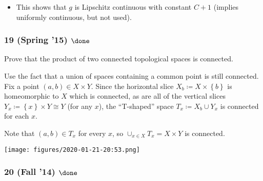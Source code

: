 \begin{solution}
\begin{itemize}
  \begin{itemize}
  \tightlist
  \item
    This shows that \(g\) is Lipschitz continuous with constant \(C+1\)
    (implies uniformly continuous, but not used).
  \end{itemize}
\end{itemize}

\end{solution}

\hypertarget{spring-15-done-2}{%
\subsubsection{\texorpdfstring{19 (Spring '15)
\(\done\)}{19 (Spring '15) \textbackslash done}}\label{spring-15-done-2}}

\begin{problem}[?]

Prove that the product of two connected topological spaces is connected.

\end{problem}

\begin{solution}

\envlist

\begin{concept}

\envlist

\end{concept}

Use the fact that a union of spaces containing a common point is still
connected. Fix a point \((a, b) \in X \times Y\). Since the horizontal
slice \(X_b\coloneqq X \times\left\{{b}\right\}\) is homeomorphic to
\(X\) which is connected, as are all of the vertical slices
\(Y_x \coloneqq\left\{{x}\right\} \times Y \cong Y\) (for any \(x\)),
the ``T-shaped'' space \(T_x \coloneqq X_b \cup Y_x\) is connected for
each \(x\).

Note that \((a, b) \in T_x\) for every \(x\), so
\(\cup_{x\in X} T_x = X \times Y\) is connected.

\texttt{[image: figures/2020-01-21-20:53.png]}\\

\end{solution}

\hypertarget{fall-14-done}{%
\subsubsection{\texorpdfstring{20 (Fall '14)
\(\done\)}{20 (Fall '14) \textbackslash done}}\label{fall-14-done}}

